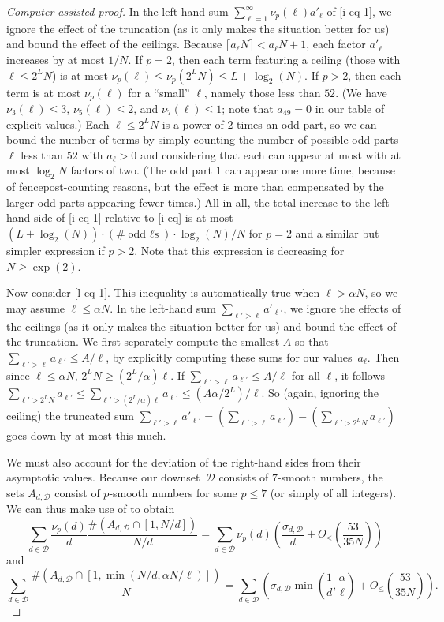 \documentclass[10pt,a4paper,reqno]{amsart}
\numberwithin{equation}{section}
\theoremstyle{plain}
\theoremstyle{definition}
\begin{document}
\begin{proof}[Computer-assisted proof]
In the left-hand sum $\sum_{\ell=1}^\infty \nu_p(\ell) a'_\ell$ of \eqref{i-eq-1}, we ignore the effect of the truncation (as it only makes the situation better for us) and bound the effect of the ceilings.
Because $\lceil a_\ell N\rceil < a_\ell N+1$, each factor $a'_\ell$ increases by at most $1/N$.
If $p=2$, then each term featuring a ceiling (those with $\ell \le 2^L N$) is at most $\nu_p(\ell) \le \nu_p(2^L N) \le L+\log_2(N)$.
If $p>2$, then each term is at most $\nu_p(\ell)$ for a ``small'' $\ell$, namely those less than $52$.
(We have $\nu_3(\ell) \le 3$, $\nu_5(\ell) \le 2$, and $\nu_7(\ell) \le 1$; note that $a_{49}=0$ in our table of explicit values.)
Each $\ell\le 2^L N$ is a power of $2$ times an odd part, so we can bound the number of terms by simply counting the number of possible odd parts $\ell$ less than $52$ with $a_\ell>0$ and considering that each can appear at most with at most $\log_2 N$ factors of two.
(The odd part $1$ can appear one more time, because of fencepost-counting reasons, but the effect is more than compensated by the larger odd parts appearing fewer times.)
All in all, the total increase to the left-hand side of \eqref{i-eq-1} relative to \eqref{i-eq} is at most $(L+\log_2(N))\cdot (\#\text{odd $\ell$s})\cdot \log_2(N)/N$ for $p=2$ and a similar but simpler expression if $p>2$.
Note that this expression is decreasing for $N\ge\exp(2)$.

Now consider \eqref{l-eq-1}.
This inequality is automatically true when $\ell > \alpha N$, so we may assume $\ell \le \alpha N$.
In the left-hand sum $\sum_{\ell' > \ell} a'_{\ell'}$, we ignore the effects of the ceilings (as it only makes the situation better for us) and bound the effect of the truncation.
We first separately compute the smallest $A$ so that $\sum_{\ell' > \ell} a_{\ell'} \le A/\ell$, by explicitly computing these sums for our values~$a_{\ell}$.
Then since $\ell \le \alpha N$, $2^L N \ge (2^L/\alpha)\ell$.
If $\sum_{\ell' > \ell} a_{\ell'} \le A/\ell$ for all $\ell$, it follows $\sum_{\ell' > 2^L N} a_{\ell'} \le \sum_{\ell' > (2^L/\alpha)\ell} a_{\ell'} \le (A \alpha/2^L)/\ell$.
So (again, ignoring the ceiling) the truncated sum $\sum_{\ell' > \ell} a'_{\ell'} = (\sum_{\ell' > \ell} a_{\ell'}) - (\sum_{\ell' > 2^L N} a_{\ell'})$ goes down by at most this much.

We must also account for the deviation of the right-hand sides from their asymptotic values.
Because our downset~$\mathcal{D}$ consists of $7$-smooth numbers, the sets $A_{d,{\mathcal D}}$ consist of $p$-smooth numbers for some $p\le 7$ (or simply of all integers).
We can thus make use of  to obtain
$$ \sum_{d \in {\mathcal D}} \frac{\nu_p(d)}{d} \frac{\# (A_{d,{\mathcal D}} \cap [1,N/d])}{N/d} = \sum_{d \in {\mathcal D}} \nu_p(d)\left(\frac{\sigma_{d,{\mathcal D}}}{d} + O_{\le}\left(\frac{53}{35N}\right)\right) $$
and
$$ \sum_{d \in {\mathcal D}} \frac{\# (A_{d,{\mathcal D}} \cap [1,\min(N/d, \alpha N/\ell)])}{N} = \sum_{d \in {\mathcal D}} \left(\sigma_{d,{\mathcal D}} \min\left( \frac{1}{d}, \frac{\alpha}{\ell}\right) + O_{\le}\left(\frac{53}{35N}\right)\right) .$$


\end{proof}
\end{document}
